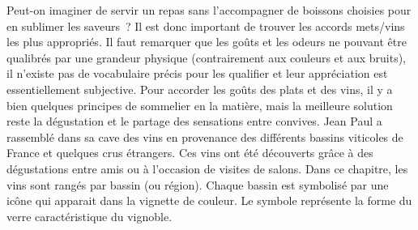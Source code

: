 Peut-on imaginer de servir un repas sans l’accompagner de boissons choisies pour en sublimer les saveurs ? Il est donc important de trouver les accords mets/vins les plus appropriés. Il faut remarquer que les goûts et les odeurs ne pouvant être qualibrés par une grandeur physique (contrairement aux couleurs et aux bruits), il n’existe pas de vocabulaire précis pour les qualifier et leur appréciation est essentiellement subjective.
Pour accorder les goûts des plats et des vins, il y a bien quelques principes de sommelier en la matière, mais la meilleure solution reste la dégustation et le partage des sensations entre convives.
Jean Paul a rassemblé dans sa cave des vins en provenance des différents bassins viticoles de France et quelques crus étrangers. Ces vins ont été découverts grâce à des dégustations entre amis ou à l’occasion de visites de salons.
Dans ce chapitre, les vins sont rangés par bassin (ou région). Chaque bassin est symbolisé par une icône qui apparait dans la vignette de couleur. Le symbole représente la forme du verre caractéristique du vignoble.
\medskip
